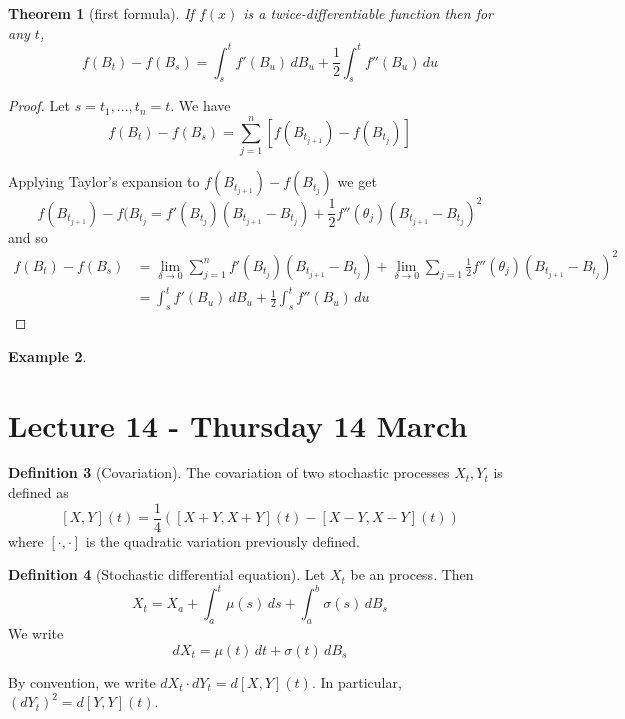 \documentclass[10pt, oneside, reqno]{amsart}
\theoremstyle{plain}%
\newtheorem{thm}{Theorem}[section]
\theoremstyle{definition}
\newtheorem{defn}[thm]{Definition}
\newtheorem{exmp}[thm]{Example}
\theoremstyle{remark}
\begin{document}
\newcommand{\itos}{}
\begin{thm}[\itos first formula]
    If $f(x)$ is a twice-differentiable function then for any $t$, \[
        f(B_t) - f(B_s) = \int_s^t f'(B_u) \, dB_u + \frac{1}{2 } \int_s^t f''(B_u) \, du
    \]
\end{thm}
\begin{proof}
    Let $s = t_1, \dots, t_{n} = t$.  We have \[
        f(B_t) - f(B_s) = \sum_{j=1}^n \left[ f(B_{t_{j+1}}) - f(B_{t_j}) \right]
    \]
    
    Applying Taylor's expansion to $f(B_{t_{j+1}}) - f(B_{t_{j}})$ we get \[
        f(B_{t_{j+1}}) - f(B_{t_j} = f'(B_{t_j}) (B_{t_{j+1}} - B_{t_j}) + \frac{1}{2} f''(\theta_j) (B_{t_{j+1}} - B_{t_j})^2 
    \] and so \begin{align*}
        f(B_t) - f(B_s) &= \lim_{\delta \rightarrow 0} \sum_{j=1}^n     f'(B_{t_j}) (B_{t_{j+1}} - B_{t_j}) + \lim_{\delta \rightarrow 0} \sum_{j=1} \frac{1}{2} f''(\theta_j) (B_{t_{j+1}} - B_{t_j})^2  \\
        &= \int_s^t f'(B_u) \, dB_u + \frac{1}{2} \int_s^t f''(B_u) \, du
    \end{align*}
\end{proof}

\begin{exmp}
    
\end{exmp}

\section{Lecture 14 - Thursday 14 March} %
\label{sec:lecture_14_thursday_14_march}
\begin{defn}[Covariation]  The covariation of two stochastic processes $X_t, Y_t$ is defined as \[
    [X,Y](t) = \frac{1}{4}( [X+Y, X+Y](t) - [X-Y, X-Y](t))
\] where $[\cdot, \cdot]$ is the quadratic variation previously defined.
\end{defn}

\begin{defn}[Stochastic differential equation]
    Let $X_t$ be an \ito process.  Then \[
        X_t = X_a + \int_a^t \mu(s) \, ds + \int_a^b \sigma(s) \, dB_s
    \]  We write \[
        dX_t = \mu(t) \, dt + \sigma(t) \, dB_s
    \] 
    
    By convention, we write $dX_t \cdot dY_t = d[X,Y](t)$.  In particular, $(dY_t)^2 = d[Y,Y](t)$.  
\end{defn}
\end{document}
